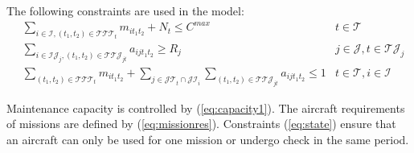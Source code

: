 \documentclass[a4paper,onecolumn,fleqn]{article}
\begin{document}
    The following constraints are used in the model:
    \begin{align}
        & \sum_{i \in \mathcal{I}, (t_1, t_2) \in \mathcal{T}\mathcal{T}\mathcal{T}_{t}} m_{it_1t_2} + N_t \leq C^{max}
          & t \in \mathcal{T} \label{eq:capacity1}\\
        & \sum_{i \in \mathcal{IJ}_j, (t_1, t_2) \in \mathcal{T}\mathcal{T}\mathcal{J}_{jt}} a_{ijt_1t_2} \geq R_j
                & j \in \mathcal{J}, t \in \mathcal{TJ}_j  \label{eq:missionres}\\
        & \sum_{(t_1, t_2) \in \mathcal{T}\mathcal{T}\mathcal{T}_{t}} m_{it_1t_2} + \sum_{j \in \mathcal{JT}_t \cap \mathcal{JI}_i} \sum_{(t_1, t_2) \in \mathcal{T}\mathcal{T}\mathcal{J}_{jt}} a_{ijt_1t_2} \leq 1 
                & t \in \mathcal{T}, i \in \mathcal{I} \label{eq:state}
    \end{align}

    Maintenance capacity is controlled by (\ref{eq:capacity1}). The aircraft requirements of missions are defined by (\ref{eq:missionres}). Constraints (\ref{eq:state}) ensure that an aircraft can only be used for one mission or undergo check in the same period.


\end{document}
